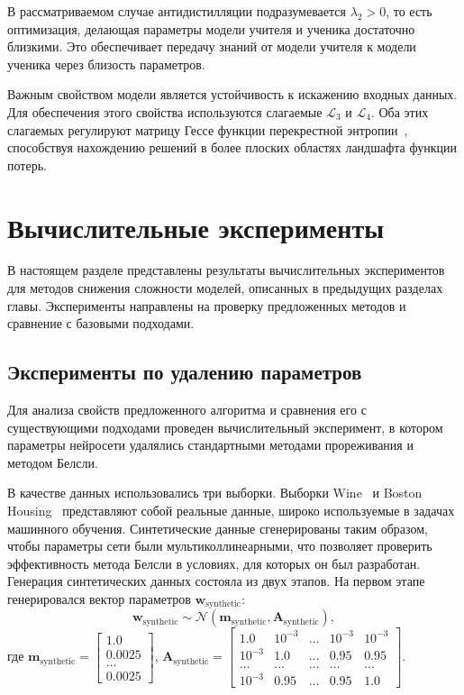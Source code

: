 В рассматриваемом случае антидистилляции подразумевается $\lambda_2 > 0$, то есть оптимизация, делающая параметры модели учителя и ученика достаточно близкими. Это обеспечивает передачу знаний от модели учителя к модели ученика через близость параметров.

Важным свойством модели является устойчивость к искажению входных данных. Для обеспечения этого свойства используются слагаемые $\mathcal{L}_3$ и $\mathcal{L}_4$. Оба этих слагаемых регулируют матрицу Гессе функции перекрестной энтропии~\cite{yao2020pyhessian,chen2020stabilizing}, способствуя нахождению решений в более плоских областях ландшафта функции потерь.

\section{Вычислительные эксперименты}\label{sec:anti-distillation-experiments}

В настоящем разделе представлены результаты вычислительных экспериментов для методов снижения сложности моделей, описанных в предыдущих разделах главы. Эксперименты направлены на проверку предложенных методов и сравнение с базовыми подходами.

\subsection{Эксперименты по удалению параметров}

Для анализа свойств предложенного алгоритма и сравнения его с существующими подходами проведен вычислительный эксперимент, в котором параметры нейросети удалялись стандартными методами прореживания и методом Белсли.

В качестве данных использовались три выборки. Выборки Wine~\cite{Wine} и Boston Housing~\cite{boston1978} представляют собой реальные данные, широко используемые в задачах машинного обучения. Синтетические данные сгенерированы таким образом, чтобы параметры сети были мультиколлинеарными, что позволяет проверить эффективность метода Белсли в условиях, для которых он был разработан. Генерация синтетических данных состояла из двух этапов.
На первом этапе генерировался вектор параметров $\mathbf{w}_{\text{synthetic}}$:
\[
    \mathbf{w}_{\text{synthetic}}  \sim \mathcal{N}(\textbf{m}_{\text{synthetic}}, \textbf{A}_{\text{synthetic}}),
\]
где
$\textbf{m}_{\text{synthetic}} = \begin{bmatrix}
1.0\\
0.0025\\
\ldots\\
0.0025
\end{bmatrix}$,
$\textbf{A}_{\text{synthetic}} = \begin{bmatrix}
1.0& 10^{-3}& \ldots& 10^{-3}& 10^{-3}\\
10^{-3}& 1.0& \ldots& 0.95& 0.95\\
\ldots&\ldots&\ldots&\ldots&\ldots\\
10^{-3}& 0.95& \ldots& 0.95& 1.0
\end{bmatrix}$.

